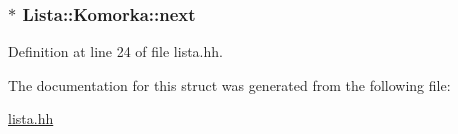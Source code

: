 \hypertarget{struct_lista_1_1_komorka_aa04e9d2ed0260f2adbff6855f7bcd77e}{
\subsubsection[{next}]{$\ast$ Lista\-::\-Komorka\-::next}}\label{struct_lista_1_1_komorka_aa04e9d2ed0260f2adbff6855f7bcd77e}


Definition at line 24 of file lista.\-hh.



The documentation for this struct was generated from the following file\-:\begin{DoxyCompactItemize}
\item 
\hyperlink{lista_8hh}{lista.\-hh}\end{DoxyCompactItemize}
